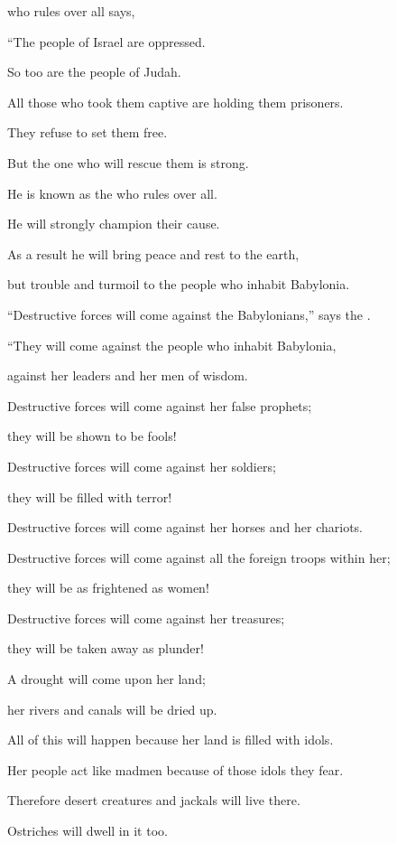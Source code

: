 {{}
who rules over all
says,
\par }{\Q “The people of Israel
are oppressed.
\par }{\Q So too
are the people of Judah.
\par }{\Q All
those who took them captive
are holding
them prisoners.
\par }{\Q They refuse
to set them free.
\par }{\Q {}But
the one who
will rescue
them is strong.
\par }{\Q He is known as the
{}
who rules over all.
\par }{\Q He will strongly champion
their cause.
\par }{\Q As a result
he will bring peace and rest
to the
earth,
\par }{\Q but trouble and turmoil
to the people who inhabit
Babylonia.
\par }{\Q {}“Destructive
forces will come against
the Babylonians,”
says
the {}.

\par }{\Q “They will come against the people
who inhabit
Babylonia,
\par }{\Q against her
leaders
and her
men of wisdom.
\par }{\Q {}Destructive
forces
will come against her false prophets;

\par }{\Q they will be shown to be fools!

\par }{\Q Destructive
forces
will come against her
soldiers;
\par }{\Q they will be
filled with terror!
\par }{\Q {}Destructive
forces
will come against her
horses
and her chariots.
\par }{\Q Destructive forces
will come against all
the foreign troops within
her;

\par }{\Q they will be
as frightened as women!

\par }{\Q Destructive
forces
will come
against her treasures;
\par }{\Q they will be taken away as plunder!
\par }{\Q {}A drought
will come upon her land;
\par }{\Q her rivers and canals
will be dried
up.

\par }{\Q All of this will happen because
her land
is filled with idols.
\par }{\Q Her people act like madmen because of those idols they fear.
\par }{\Q {}Therefore
desert creatures
and jackals
will live
there.
\par }{\Q Ostriches
will dwell
in it too.

}
